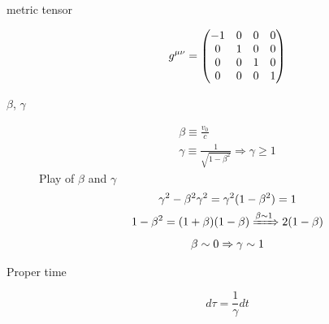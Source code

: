 \begin{description}
    \item[metric tensor] 
	\begin{equation}
	    \label{eqn:sr::metricTensor}
	    g^{\mu\nu} = 
	    \begin{pmatrix}
		-1  & 0	& 0 & 0	\\
		0   & 1	& 0 & 0 \\
		0   & 0	& 1 & 0 \\
		0   & 0	& 0 & 1 \\
	    \end{pmatrix}
	\end{equation}
    \item [$\beta$, $\gamma$]
	\begin{equation}
	    \label{eqn:sm::betaGamma}
	    \begin{gathered}
		\beta \equiv \frac{v_0}{c} \\
		\gamma	\equiv \frac{1}{\sqrt{1-\beta^2}}	\Rightarrow \gamma \ge 1
	    \end{gathered}
	\end{equation}
	Play of $\beta$ and $\gamma$
	\begin{equation}
	    \begin{gathered}
		\gamma^2 - \beta^2\gamma^2 = \gamma^2(1-\beta^2) = 1	\\
		1-\beta^2 = (1+\beta)(1-\beta) \xRightarrow{\beta\sim 1} 2(1-\beta)  \\
		\beta \sim 0 \Rightarrow \gamma \sim 1  \\
	    \end{gathered}
	\end{equation}

    \item [Proper time]
	\begin{equation}
	    \label{eqn:sr::properTime}
	    d\tau = \frac{1}{\gamma}dt
	\end{equation}
\end{description}
